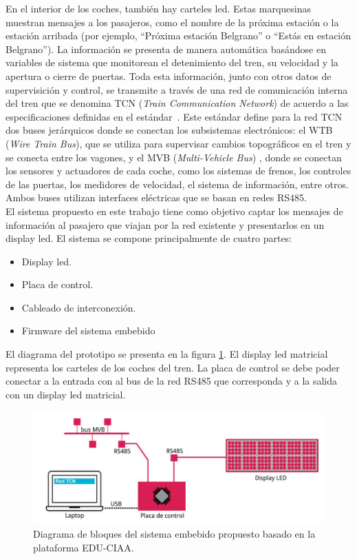 En el interior de los coches, también hay carteles led. Estas marquesinas muestran mensajes a los pasajeros, como el nombre de la próxima estación o la estación arribada (por ejemplo, “Próxima estación Belgrano” o “Estás en estación Belgrano”). La información se
presenta de manera automática basándose en variables de sistema que monitorean el detenimiento del tren, su velocidad y la apertura o cierre de puertas. Toda esta información, junto con otros datos de supervisición y control, se transmite a través de una red de comunicación interna del tren que se denomina TCN (\textit{Train Communication Network}) de acuerdo a las especificaciones definidas en el estándar\ \citep{IEC-61375-1999}. Este estándar define para la red TCN dos buses jerárquicos donde se conectan los subsistemas electrónicos: el WTB (\textit{Wire Train Bus}), que se utiliza para supervisar cambios topográficos en el tren y se conecta entre los vagones, y el MVB (\textit{Multi-Vehicle Bus}) \citep{CSN-EN-61375-2-1}\citep{IEC-61375-3-1:2012}, donde se conectan los sensores y actuadores de cada coche, como los sistemas de frenos, los controles de las puertas, los medidores de velocidad, el sistema de información, entre otros. Ambos buses utilizan interfaces eléctricas que se basan en redes RS485.\\


 El sistema propuesto en este trabajo tiene como objetivo captar los mensajes de información al pasajero que viajan por la red existente y presentarlos en un display led. El sistema se compone principalmente de cuatro partes:
 \begin{itemize}
\item Display led.
\item Placa de control.
\item Cableado de interconexión.
\item Firmware del sistema embebido
 \end{itemize}

El diagrama del prototipo se presenta en la figura \ref{fig:diagramaPIDSCIAA}. El display led matricial representa los carteles de los coches del tren. La placa de control se debe poder conectar a la entrada con al bus de la red RS485 que corresponda y a la salida con un display led matricial.

\begin{figure}[ht]
	\centering
	\includegraphics[width=1\textwidth]{./Figures/diagramaPIDSCIAA.png}
	\caption{Diagrama de bloques del sistema embebido propuesto basado en la plataforma EDU-CIAA.}
	\label{fig:diagramaPIDSCIAA}
\end{figure}


